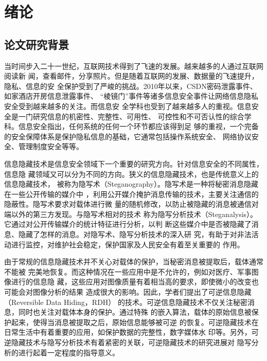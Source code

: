 ﻿
\chapter{绪论}
\label{chap:introduction}

\section{论文研究背景}
\label{s:background}
当时间步入二十一世纪，互联网技术得到了飞速的发展。越来越多的人通过互联网阅读新
闻，查看邮件，分享照片。但是随着互联网的发展、数据量的飞速提升，隐私、信息的安
全保护受到了严峻的挑战。2010年以来，CSDN密码泄露事件、如家酒店开房信息泄露事件、
``棱镜门''事件等诸多信息安全事件让网络信息隐私安全受到越来越多的关注。而信息安
全学科也受到了越来越多人的重视。信息安全是一门研究信息的机密性、完整性、可用性、
可控性和不可否认性的综合学科。信息安全指出，任何系统的任何一个环节都应该得到足
够的重视，一个完备的安全保障体系是保护隐私信息的基础，它通常包括操作系统安全、
网络协议安全、管理制度安全等等。
\par
信息隐藏技术是信息安全领域下一个重要的研究方向。针对信息安全的不同属性，信息隐
藏领域又可以分为不同的方向。狭义的信息隐藏技术，也是传统意义上的信息隐藏技术，
被称为隐写术（Steganography）。隐写术是一种将秘密消息隐藏在一些公开传输的媒介中
，利用公开媒介掩护消息传输的技术，主要关注通信的隐蔽性。隐写术要求对载体进行微
量的随机修改，以防止被隐藏的消息被通信对端以外的第三方发现。与隐写术相对的技术
称为隐写分析技术（Steganalysis）。它通过对公开传输媒介的统计特征进行分析，以判
断这些媒介中是否被隐藏了消息、隐藏了怎样的消息。对隐写术、隐写分析技术的深入研
究，有助于对非法活动进行监控，对维护社会稳定，保护国家及人民安全有着至关重要的
作用。
\par
由于常规的信息隐藏技术并不关心对载体的保护，当秘密消息被提取后，载体通常不能被
完美地恢复。而这种情况在一些应用中是不允许的，例如对医疗、军事图像进行的信息隐
藏，这些应用对图像质量有着相当高的要求，即使微小的改变也可能会对图像分析的结果
造成很大的影响。因此，学者们提出了可逆信息隐藏（Reversible Data Hiding，RDH）
的技术。可逆信息隐藏技术不仅关注秘密消息，同时也关注对载体本身的保护。通过特殊
的嵌入算法，载体的原始信息被保护起来，使得当消息被提取之后，原始信息能够被可逆
的恢复。可逆隐藏技术在日常生活中有着重要的应用，如保护数据的完整性，数字媒体水
印等。另外，可逆隐藏技术与隐写分析技术有着紧密的关联，可逆隐藏技术的研究进展对
隐写分析的进行起着一定程度的指导意义。
\par



